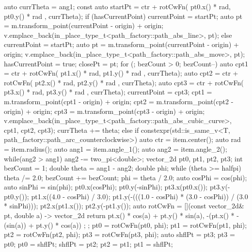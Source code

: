 \begin{codeblock}
{{{        auto currTheta = ang1;
        const auto startPt =
        ctr + rotCwFn({ pt0.x() * rad, pt0.y() * rad }, currTheta);
        if (hasCurrentPoint) {
          currentPoint = startPt;
          auto pt = m.transform_point(currentPoint - origin) + origin;
          v.emplace_back(in_place_type_t<path_factory::path_abs_line>, pt);
        }
        else {
          currentPoint = startPt;
          auto pt = m.transform_point(currentPoint - origin) + origin;
          v.emplace_back(in_place_type_t<path_factory::path_abs_move>, pt);
          hasCurrentPoint = true;
          closePt = pt;
        }
        for (; bezCount > 0; bezCount--) {
          auto cpt1 = ctr + rotCwFn({ pt1.x() * rad, pt1.y() * rad }, currTheta);
          auto cpt2 = ctr + rotCwFn({ pt2.x() * rad, pt2.y() * rad },
            currTheta);
          auto cpt3 = ctr + rotCwFn({ pt3.x() * rad, pt3.y() * rad },
            currTheta);
          currentPoint = cpt3;
          cpt1 = m.transform_point(cpt1 - origin) + origin;
          cpt2 = m.transform_point(cpt2 - origin) + origin;
          cpt3 = m.transform_point(cpt3 - origin) + origin;
          v.emplace_back(in_place_type_t<path_factory::path_abs_cubic_curve>, cpt1,
            cpt2, cpt3);
          currTheta += theta;
        }
      }
      else if constexpr(std::is_same_v<T, path_factory::path_arc_counterclockwise>) {
      {
        auto ctr = item.center();
        auto rad = item.radius();
        auto ang1 = item.angle_1();
        auto ang2 = item.angle_2();
        while(ang2 > ang1) {
          ang2 -= two_pi<double>;
        }
        vector_2d pt0, pt1, pt2, pt3;
        int bezCount = 1;
        double theta = ang1 - ang2;
        double phi;
        while (theta >= halfpi) {
          theta /= 2.0;
          bezCount += bezCount;
        }
        phi = theta / 2.0;
        auto cosPhi = cos(phi);
        auto sinPhi = sin(phi);
        pt0.x(cosPhi);
        pt0.y(-sinPhi);
        pt3.x(pt0.x());
        pt3.y(-pt0.y());
        pt1.x((4.0 - cosPhi) / 3.0);
        pt1.y(-(((1.0 - cosPhi) * (3.0 - cosPhi)) / (3.0 * sinPhi)));
        pt2.x(pt1.x());
        pt2.y(-pt1.y());
        auto rotCwFn = [](const vector_2d& pt, double a) -> vector_2d {
          return { pt.x() * cos(a) + pt.y() * sin(a),
            -(pt.x() * -(sin(a)) + pt.y() * cos(a)) };
        };
        pt0 = rotCwFn(pt0, phi);
        pt1 = rotCwFn(pt1, phi);
        pt2 = rotCwFn(pt2, phi);
        pt3 = rotCwFn(pt3, phi);
        auto shflPt = pt3;
        pt3 = pt0;
        pt0 = shflPt;
        shflPt = pt2;
        pt2 = pt1;
        pt1 = shflPt;
}}}}
\end{codeblock}
